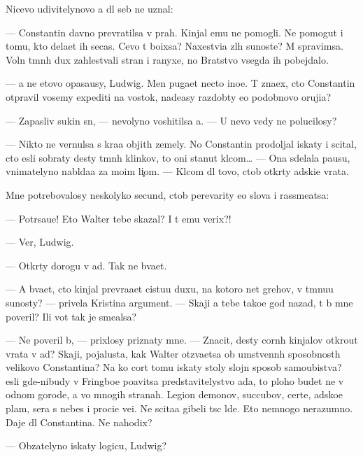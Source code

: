 \documentclass[10pt]{book}
\begin{document}
Nicevo udivitelynovo {\y}a dl{\ia} seb{\ia} ne uznal:

— Constantin davno prevratilsa v prah. Kinjal{\yi} {\y}emu ne pomogli. Ne pomogut i tomu, kto dela{\y}et ih se{\y}cas. Cevo t{\yi} bo{\y}ixsa? Naxestvi{\y}a zl{\yi}h su{\x}noste{\y}? M{\yi} spravimsa. Voln{\yi} t{\e}mn{\yi}h dux zahlest{\yi}vali stran{\yi} i ranyxe, no Bratstvo vsegda ih pobejdalo.

— {\Y}a ne etovo opasa{\y}usy, Ludwig. Men{\ia} puga{\y}et necto ino{\y}e. T{\yi} zna{\y}ex, cto Constantin otpravil vosemy expediti{\y} na vostok, nade{\y}asy razdob{\yi}ty {\y}e{\x}o podobnovo oruji{\y}a?

— Zapasliv{\yi}{\y} sukin s{\yi}n, — nevolyno voshitilsa {\y}a. — U nevo vedy ne polucilosy?

— Nikto ne vernulsa s kra{\y}a objit{\yi}h zemely. No Constantin prodoljal iskaty i scital, cto {\y}esli sobraty des{\ia}ty t{\e}mn{\yi}h klinkov, to oni stanut kl{\io}com… — Ona sdelala pausu, vnimatelyno nabl{\io}da{\y}a za mo{\y}im li{\c}om. — Kl{\io}com dl{\ia} tovo, ctob{\yi} otkr{\yi}ty adski{\y}e vrata.

Mne potrebovalosy neskolyko secund, ctob{\yi} perevarity {\y}e{\y}o slova i rassme{\y}atsa:

— Potr{\ia}sa{\y}u{\x}e! Eto Walter tebe skazal? I t{\yi} {\y}emu verix?!

— Ver{\io}, Ludwig.

— Otkr{\yi}ty dorogu v ad. Tak ne b{\yi}va{\y}et.

— A b{\yi}va{\y}et, cto kinjal prevra{\x}a{\y}et cistu{\y}u duxu, na kotoro{\y} net grehov, v t{\e}mnu{\y}u su{\x}nosty? — privela Kristina argument. — Skaji {\y}a tebe tako{\y}e god nazad, t{\yi} b{\yi} mne poveril? Ili vot tak je sme{\y}alsa?

— Ne poveril b{\yi}, — prixlosy priznaty mne. — Znacit, des{\ia}ty corn{\yi}h kinjalov otkro{\y}ut vrata v ad? Skaji, pojalu{\y}sta, kak Walter otz{\yi}va{\y}etsa ob umstvenn{\yi}h sposobnost{\ia}h velikovo Constantina? Na ko{\y} cort tomu iskaty stoly slojn{\yi}{\y} sposob samoubi{\y}stva? {\Y}esli gde-nibudy v Fringboe po{\y}avitsa predstavitelystvo ada, to ploho budet ne v odnom gorode, a vo mnogih stranah. Legion{\yi} demonov, succubov, certe{\y}, adsko{\y}e plam{\ia}, sera s nebes i proci{\y}e ve{\x}i. Ne scita{\y}a gibeli t{\yi}s{\ia}c l{\io}de{\y}. Eto nemnogo nerazumno. Daje dl{\ia} Constantina. Ne nahodix?

— Ob{\ia}zatelyno iskaty logicu, Ludwig?
\end{document}
